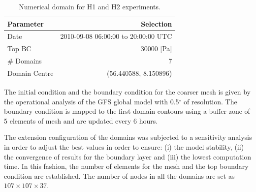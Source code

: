 \begin{table}[h!]
	\caption{Numerical domain for H1 and H2 experiments.}\label{tab:05_config_hov}
	\centering
	\begin{tabular}{lr}
		\toprule
		Parameter & Selection \\
		\midrule
		Date	 	 & 2010-09-08 06:00:00  to 20:00:00 UTC  \\
		Top BC	& 30000 [Pa]\\
		\# Domains	& 7   \\
		Domain Centre	& (56.440588, 8.150896)   \\
		\bottomrule
	\end{tabular}
\end{table}

The initial condition and the boundary condition for the coarser mesh is given by the operational analysis of the GFS global model with 0.5$^\circ$ of resolution. The boundary condition is mapped to the first domain contours using a buffer zone of 5 elements of mesh and are updated every 6 hours. 

The extension configuration of the domains was subjected to a sensitivity analysis in order to adjust the best values in order to ensure: (i) the model stability, (ii) the convergence of results for the boundary layer and (iii) the lowest computation time. In this fashion, the number of elements for the mesh and the top boundary condition are established. The number of nodes in all the domains are set as $107\times107\times37$.

